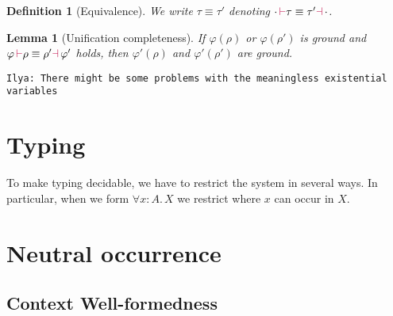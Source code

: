 \documentclass[a4,natbib=false]{article}
\newtheorem{lemma}{Lemma}
\newtheorem{definition}{Definition}
\newcommand{\ilyam}[1]{{\color{red} \texttt{Ilya:  #1}}}
\newcommand{\foralltype}[2]{\forall {#1}.\,#2}
\newcommand{\isvtype}[1]{{#1} \, \mathsf{vtype}}
\newcommand{\judgectx}[2]{{#1} \vdash {#2}}
\newcommand{\judgevtype}[2]{{#1} \vdash \isvtype{#2}}
\newcommand{\judgeaequiv}[4]{{#1}\,{\color{purple}\vdash} {#2} \equiv {#3} {\color{purple}\dashv}\,{#4}}
\newcommand{\Infer}[3]{\inferrule*[right={#1}]{#2}{#3}}
\begin{document}
\begin{definition}[Equivalence]
  We write $\tau \equiv \tau'$ denoting $\judgeaequiv{\cdot}{\tau}{\tau'}{\cdot}$.
\end{definition}

\begin{lemma} [Unification completeness]
  If $\varphi(\rho)$ or $\varphi(\rho')$ is ground and 
  $\judgeaequiv{\varphi}{\rho}{\rho'}{\varphi'}$ holds, then $\varphi'(\rho)$
  and $\varphi'(\rho')$ are ground.
\end{lemma}
\ilyam{There might be some problems with the meaningless existential variables}

\section{Typing}
\label{sec:rules}

To make typing decidable, we have to restrict the system in several ways. In
particular, when we form $\foralltype{x:A}{X}$ we restrict where $x$ can occur
in $X$.

\section{Neutral occurrence}


\subsection{Context Well-formedness}

\end{document}
